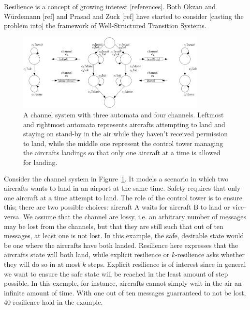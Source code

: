 Resilience is a concept of growing interest [references]. Both Okzan and Würdemann [ref] and Prasad and Zuck [ref] have started to consider [casting the problem into] the framework of Well-Structured Transition Systems. 
 

\begin{center}
	\begin{figure}
			\hspace{0.75cm}
\includegraphics[width=0.85\textwidth]{FigureB}
	\caption{A channel system with three automata and four channels. Leftmost and rightmost automata represents aircrafts attempting to land and staying on stand-by in the air while they haven't received permission to land, while the middle one represent the control tower managing the aircrafts landings so that only one aircraft at a time is allowed for landing.}
					\label{air control}
	\end{figure}
\end{center}

Consider the channel system in Figure~\ref{air control}. It models a scenario in which two aircrafts wants to land in an airport at the same time. Safety requires that only one aircraft at a time attempt to land. The role of the control tower is to ensure this;
there are two possible choices: aircraft A waits for aircraft B to land
or vice-versa. 
We assume that the channel are lossy, i.e. an arbitrary number of messages may be lost from the channels, but that they are still such that out of ten messages, at least one is not lost.
In this example, the safe, desirable state would be one where the aircrafts have both landed. 
Resilience here expresses that the aircrafts state will both land, while explicit resilience or $k$-resilience asks whether they will do so in at most $k$ steps. 
Explicit resilience is of interest since in general we want to ensure the safe state will
be reached in
the least amount of step possible. 
In this exemple, for instance, aircrafts cannot simply wait in the air an infinite amount of time.
With one out of ten messages guarranteed to not be lost, $40$-resilience hold in the example.




